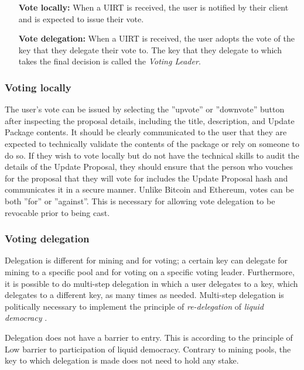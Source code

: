 \begin{itemize}
\item[\textbf{Vote locally:}] When a UIRT is received, the user is notified by their client and is expected to issue their vote.
\item[\textbf{Vote delegation:}] When a UIRT is received, the user adopts the vote of the key that they delegate their vote to. The key that they delegate to which takes the final decision is called the \emph{Voting Leader}.
\end{itemize}

\subsubsection*{Voting locally} 

The user's vote can be issued by selecting the ''upvote'' or ''downvote'' button after inspecting the proposal details, including the title, description, and Update Package contents. It should be clearly communicated to the user that they are expected to technically validate the contents of the package or rely on someone to do so. If they wish to vote locally but do not have the technical skills to audit the details of the Update Proposal, they should ensure that the person who vouches for the proposal that they will vote for includes the Update Proposal hash and communicates it in a secure manner. Unlike Bitcoin and Ethereum, votes can be both ''for'' or ''against''. This is necessary for allowing vote delegation to be revocable prior to being cast.

\subsubsection*{Voting delegation}

Delegation is different for mining and for voting; a certain key can delegate for mining to a specific pool and for voting on a specific voting leader. Furthermore, it is possible to do multi-step delegation in which a user delegates to a key, which delegates to a different key, as many times as needed. Multi-step delegation is politically necessary to implement the principle of \emph{re-delegation} of \emph{liquid democracy} \cite{liqdemocracy}.

Delegation does not have a barrier to entry. This is according to the principle of Low barrier to participation of liquid democracy. Contrary to mining pools, the key to which delegation is made does not need to hold any stake.

